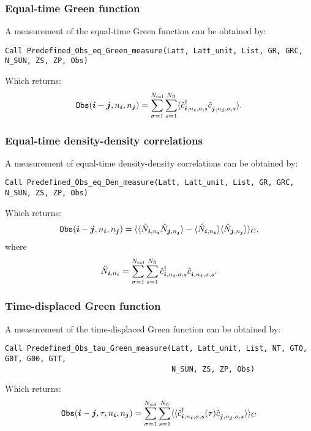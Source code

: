 \subsubsection{Equal-time Green function}

A measurement of the equal-time Green function can be obtained by:
\begin{lstlisting}[style=fortran]
Call Predefined_Obs_eq_Green_measure(Latt, Latt_unit, List, GR, GRC, N_SUN, ZS, ZP, Obs)
\end{lstlisting}

Which returns:
\begin{align}
\texttt{Obs}(\ve{i}-\ve{j}, n_{\ve{i}}, n_{\ve{j}}) = \sum_{\sigma=1}^{N_\text{col}} \sum_{s=1}^{N_\text{fl}} \langle  \hat{c}^{\dagger}_{\ve{i}, n_{\ve{i}},\sigma,s} \hat{c}^{\phantom\dagger}_{\ve{j}, n_{\ve{j}},\sigma,s} \rangle.
\end{align}


\subsubsection{Equal-time density-density correlations}

A measurement of equal-time density-density correlations can be obtained by:
\begin{lstlisting}[style=fortran]
Call Predefined_Obs_eq_Den_measure(Latt, Latt_unit, List, GR, GRC, N_SUN, ZS, ZP, Obs)
\end{lstlisting}
Which returns:
\begin{align}
\texttt{Obs}(\boldsymbol{i}-\boldsymbol{j}, n_{\boldsymbol{i}}, n_{\boldsymbol{j}}) = \langle  \langle\hat{ N}_{\boldsymbol{i},n_{\boldsymbol{i}}}  \hat{N}_{\boldsymbol{j},n_{\boldsymbol{j}}}\rangle - \langle \hat{N}_{\boldsymbol{i},n_{\boldsymbol{i}}} \rangle  \langle \hat{N}_{\boldsymbol{j},n_{\boldsymbol{j}}}\rangle \rangle_C,
\end{align}
where
\begin{align}
\label{Density_op.eq}
\hat{N}_{\ve{i},n_{\ve{i}}}  = \sum_{\sigma=1}^{N_\text{col}} \sum_{s=1}^{N_\text{fl}}  \hat{c}^{\dagger}_{\ve{i},n_{\ve{i}},\sigma,s} \hat{c}^{\phantom\dagger}_{\ve{i}, n_{\ve{i}},\sigma,s}.
\end{align}


\subsubsection{Time-displaced Green function}

A measurement of the time-displaced Green function can be obtained by:
\begin{lstlisting}[style=fortran]
Call Predefined_Obs_tau_Green_measure(Latt, Latt_unit, List, NT, GT0, G0T, G00, GTT, 
                                      N_SUN, ZS, ZP, Obs)
\end{lstlisting}
Which returns:
\begin{align}
\texttt{Obs}(\ve{i} - \ve{j}, \tau, n_{\ve{i}},  n_{\ve{j}} )  = \sum_{\sigma=1}^{N_\text{col}} \sum_{s=1}^{N_\text{fl}} \langle \langle  \hat{c}^{\dagger}_{\ve{i},n_{\ve{i}},  \sigma,s}(\tau) \hat{c}^{\phantom\dagger}_{\ve{j}, n_{\ve{j}},\sigma,s} \rangle \rangle_{C}
\end{align}


